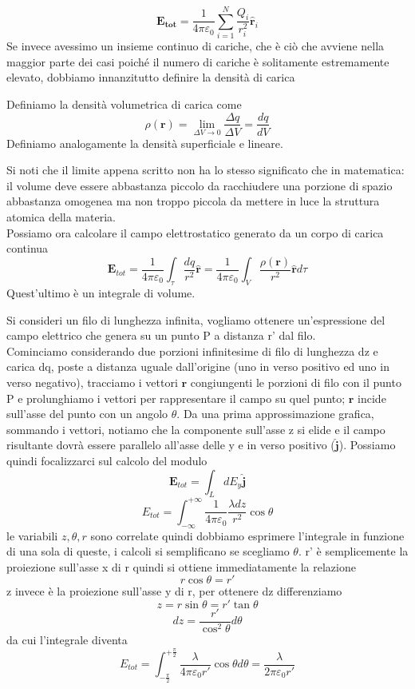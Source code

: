 \documentclass[
10pt, %
a4paper, %
oneside, %
headinclude,footinclude, %
BCOR5mm, %
]{scrartcl}
\begin{document}
\[\mathbf{E_{tot}} = \frac{1}{4\pi\varepsilon_0}\sum_{i=1}^{N}\frac{Q_i}{ r_i^2} \hat{\mathbf{r}}_i\]
Se invece avessimo un insieme continuo di cariche, che è ciò che avviene nella maggior parte dei casi poiché il numero di cariche è solitamente estremamente elevato, dobbiamo innanzitutto definire la densità di carica
\begin{definizione}
Definiamo la densità volumetrica di carica come
\[\rho(\mathbf{r})=\lim_{\Delta V \to 0} \frac{\Delta q}{\Delta V} = \frac{dq}{dV}\]
Definiamo analogamente la densità superficiale e lineare. 
\end{definizione}
Si noti che il limite appena scritto non ha lo stesso significato che in matematica: il volume deve essere abbastanza piccolo da racchiudere una porzione di spazio abbastanza omogenea ma non troppo piccola da mettere in luce la struttura atomica della materia.\\
Possiamo ora calcolare il campo elettrostatico generato da un corpo di carica continua 
\[\mathbf{E}_{tot} = \frac{1}{4\pi\varepsilon_0}\int_{\tau}\frac{dq}{r^2}\hat{\mathbf{r}} = \frac{1}{4\pi\varepsilon_0} \int_V\frac{\rho(\mathbf{r})}{r^2}\hat{\mathbf{r}}d\tau\]
Quest'ultimo è un integrale di volume.
\begin{esercizio}
Si consideri un filo di lunghezza infinita, vogliamo ottenere un'espressione del campo elettrico che genera su un punto P a distanza r' dal filo. \\
Cominciamo considerando due porzioni infinitesime di filo di lunghezza dz e carica dq, poste a distanza uguale dall'origine (uno in verso positivo ed uno in verso negativo), tracciamo i vettori $\mathbf{r}$ congiungenti le porzioni di filo con il punto P e prolunghiamo i vettori per rappresentare il campo su quel punto; $\mathbf{r}$ incide sull'asse del punto con un angolo $\theta$. Da una prima approssimazione grafica, sommando i vettori, notiamo che la componente sull'asse z si elide e il campo risultante dovrà essere parallelo all'asse delle y e in verso positivo ($\hat{\mathbf{j}}$). Possiamo quindi focalizzarci sul calcolo del modulo
\[\mathbf{E}_{tot} = \int_L dE_y\hat{\mathbf{j}}\]
\[E_{tot} = \int^{+\infty}_{-\infty} \frac{1}{4\pi\varepsilon_0}\frac{\lambda dz}{r^2}\cos\theta\]
le variabili \(z, \theta, r\) sono correlate quindi dobbiamo esprimere l'integrale in funzione di una sola di queste, i calcoli si semplificano se scegliamo $\theta$. r' è semplicemente la proiezione sull'asse x di r quindi si ottiene immediatamente la relazione
\[r \cos\theta = r'\]
z invece è la proiezione sull'asse y di r, per ottenere dz differenziamo
\[z = r \sin\theta = r' \tan\theta\]
\[dz = \frac{r'}{\cos^2\theta}d\theta\]
da cui l'integrale diventa
\[E_{tot} = \int^{+\frac{\pi}{2}}_{-\frac{\pi}{2}} \frac{\lambda}{4\pi\varepsilon_0 r'}\cos\theta d\theta = \frac{\lambda}{2\pi\varepsilon_0 r'}\]
\end{esercizio}
\end{document}
